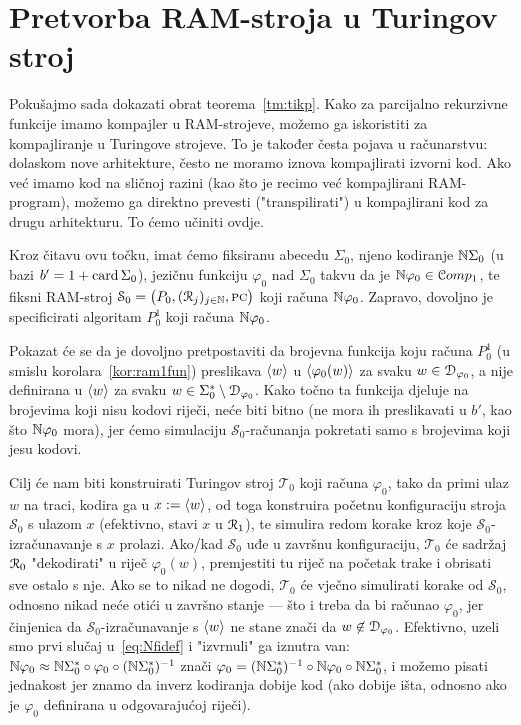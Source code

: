 \section{Pretvorba RAM-stroja u Turingov stroj}\label{sec:RAM>Turing}

Pokušajmo sada dokazati obrat teorema~\ref{tm:tikp}. Kako za parcijalno rekurzivne funkcije imamo kompajler u RAM-strojeve, možemo ga iskoristiti za kompajliranje u Turingove strojeve. To je također česta pojava u računarstvu: dolaskom nove arhitekture, često ne moramo iznova kompajlirati izvorni kod. Ako već imamo kod na sličnoj razini (kao što je recimo već kompajlirani RAM-program), možemo ga direktno prevesti ("transpilirati") u kompajlirani kod za drugu arhitekturu. To ćemo učiniti ovdje.

Kroz čitavu ovu točku, imat ćemo fiksiranu abecedu $\Sigma_0$, njeno kodiranje ${\mathbb N}\Sigma_0$ (u bazi $b'=1+\operatorname{card}\Sigma_0$), jezičnu funkciju $\varphi_0$ nad $\Sigma_0$ takvu da je ${\mathbb N}\varphi_0\in\mathcal Comp_1$, te fiksni RAM-stroj $\mathcal S_0=\bigl(P_0,(\mathcal R_{j})_{j\in{\mathbb N}},\textsc{pc}\bigr)$ koji računa ${\mathbb N}\varphi_0$. Zapravo, dovoljno je specificirati algoritam $P_0^1$ koji računa ${\mathbb N}\varphi_0$. 

\begin{napomena}\label{nap:approxNfi}
Pokazat će se da je dovoljno pretpostaviti da brojevna funkcija koju računa $P_0^1$ (u smislu korolara~\ref{kor:ram1fun}) preslikava $\langle w\rangle$ u $\langle\varphi_0(w)\rangle$ za svaku $w\in\mathcal D_{\varphi_0}$, a nije definirana u $\langle w\rangle$ za svaku $w\in\Sigma_0^*\setminus\mathcal D_{\varphi_0}$. Kako točno ta funkcija djeluje na brojevima koji nisu kodovi riječi, neće biti bitno (ne mora ih preslikavati u $b'$, kao što ${\mathbb N}\varphi_0$ mora), jer ćemo simulaciju $\mathcal S_0$-računanja pokretati samo s brojevima koji jesu kodovi.
\end{napomena}

Cilj će nam biti konstruirati Turingov stroj $\mathcal T_0$ koji računa $\varphi_0$, tako da primi ulaz $w$ na traci, kodira ga u $x:=\langle w\rangle$, od toga konstruira početnu  konfiguraciju stroja $\mathcal S_0$ s ulazom $x$ (efektivno, stavi $x$ u $\mathcal R_{1}$), te simulira redom korake kroz koje $\mathcal S_0$-izračunavanje s $x$ prolazi. Ako\slash kad $\mathcal S_0$ uđe u završnu konfiguraciju, $\mathcal T_0$ će sadržaj $\mathcal R_{0}$ "dekodirati" u riječ $\varphi_0(w)$, premjestiti tu riječ na početak trake i obrisati sve ostalo s nje. Ako se to nikad ne dogodi, $\mathcal T_0$ će vječno simulirati korake od $\mathcal S_0$, odnosno nikad neće otići u završno stanje --- što i treba da bi računao $\varphi_0$, jer činjenica da $\mathcal S_0$-izračunavanje s $\langle w\rangle$ ne stane znači da $w\not\in\mathcal D_{\varphi_0}$. Efektivno, uzeli smo prvi slučaj u~\eqref{eq:Nfidef} i "izvrnuli" ga iznutra van: ${\mathbb N}\varphi_0\approx{\mathbb N}\Sigma_0^*\circ\varphi_0\circ({\mathbb N}\Sigma_0^*)^{-1}$ znači $\varphi_0=({\mathbb N}\Sigma_0^*)^{-1}\circ{\mathbb N}\varphi_0\circ{\mathbb N}\Sigma_0^*$, i možemo pisati jednakost jer znamo da inverz kodiranja dobije kod (ako dobije išta, odnosno ako je $\varphi_0$ definirana u odgovarajućoj riječi).

